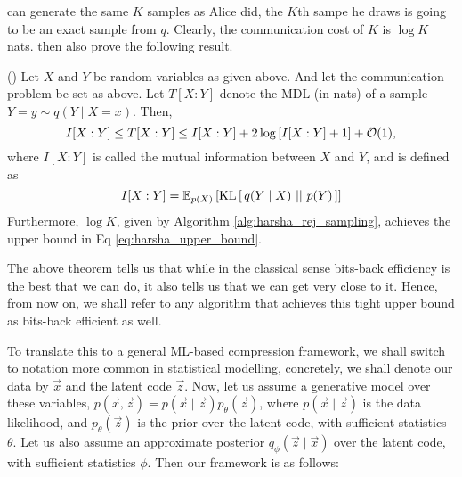 can generate the same $K$ samples as Alice did, the $K$th sampe he draws is
going to be an exact sample from $q$. Clearly, the communication cost of $K$ is
$\log K$ nats. \cite{harsha2007communication} then also prove the following result.
\begin{theorem}{(\cite{harsha2007communication})}
Let $X$ and $Y$ be random variables as given above. And let the communication
problem be set as above. Let $T[X : Y]$ denote the MDL (in nats) of a sample
$Y=y \sim q(Y \mid X=x)$. Then,
\begin{equation}
\label{eq:harsha_upper_bound}
  I[X : Y] \leq T[X : Y] \leq I[X : Y] + 2\log \left[ I[X : Y] + 1 \right] + \Oh(1),
\end{equation}
where $I[ X : Y ]$ is called the mutual information between $X$ and $Y$, and is
defined as
\[
  I[ X : Y ] = \Exp{\KL{q(Y \mid X)}{p(Y)}}{p(X)}
\]
Furthermore, $\log K$, given by Algorithm \ref{alg:harsha_rej_sampling},
achieves the upper bound in Eq \ref{eq:harsha_upper_bound}.
\end{theorem}
\par
The above theorem tells us that while in the classical sense bits-back efficiency
is the best that we can do, it also tells us that we can get very close to it.
Hence, from now on, we shall refer to any algorithm that achieves this tight
upper bound as bits-back efficient as well.
\par
To translate this to a general ML-based compression framework, we shall switch
to notation more common in statistical modelling, concretely, we shall denote
our data by $\vec{x}$ and the latent code $\vec{z}$. Now, let us assume a
generative model over these variables, $p(\vec{x}, \vec{z}) = p(\vec{x} \mid
\vec{z})p_\theta(\vec{z})$, where $p(\vec{x} \mid \vec{z})$ is the data likelihood, and
$p_\theta(\vec{z})$ is the prior over the latent code, with sufficient
statistics $\theta$. Let us also assume an approximate posterior $q_\phi(\vec{z}
\mid \vec{x})$ over the latent code, with sufficient statistics $\phi$. Then our
framework is as follows:
